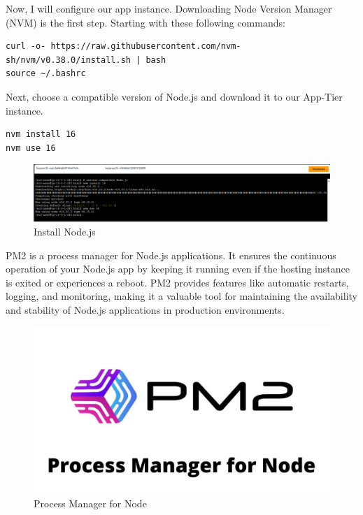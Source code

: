 \documentclass{article}
\begin{document}
\newpage
Now, I will configure our app instance. Downloading Node Version Manager (NVM) is the first step. Starting with these following commands:\par
\begin{lstlisting}
curl -o- https://raw.githubusercontent.com/nvm-sh/nvm/v0.38.0/install.sh | bash
source ~/.bashrc
\end{lstlisting}

Next, choose a compatible version of Node.js and download it to our App-Tier instance.\par
\begin{lstlisting}
nvm install 16
nvm use 16
\end{lstlisting}

\begin{figure}[h]
    \centering
    \includegraphics[width=12cm]{Pictures/App-tier/install nodejs.png}
    \caption{Install Node.js}
    \label{fig:enter-label}
\end{figure}

PM2 is a process manager for Node.js applications. It ensures the continuous operation of your Node.js app by keeping it running even if the hosting instance is exited or experiences a reboot. PM2 provides features like automatic restarts, logging, and monitoring, making it a valuable tool for maintaining the availability and stability of Node.js applications in production environments.\par

\begin{figure}[h]
    \centering
    \includegraphics[width=12cm]{Pictures/App-tier/PM2.jpg}
    \caption{Process Manager for Node}
    \label{fig:enter-label}
\end{figure}
\end{document}
